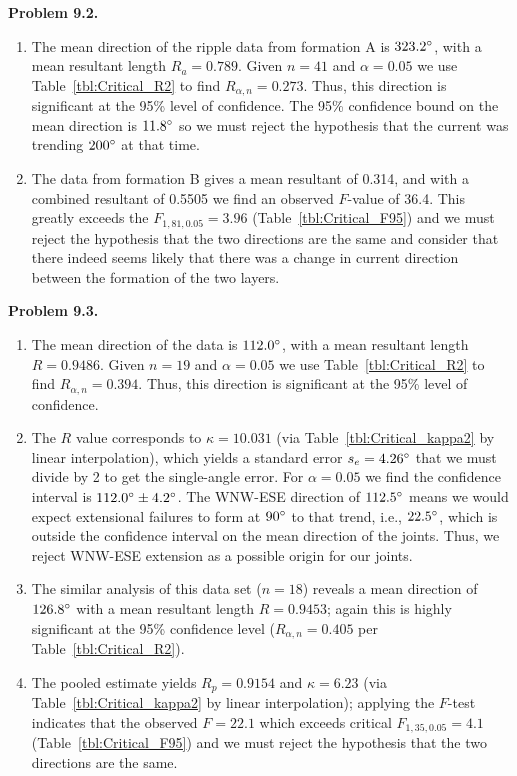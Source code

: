 \noindent
\bf{Problem 9.2.} \\

\begin{enumerate}[label=\alph*)]
\item  The mean direction of the ripple data from formation A is $323.2^{\circ}$,
with a mean resultant length $R_a = 0.789$.  Given $n = 41$ and $\alpha = 0.05$ we use Table~\ref{tbl:Critical_R2}
to find $R_{\alpha,n} = 0.273$.  Thus, this direction is significant at the 95\% level of confidence.
The 95\% confidence bound on the mean direction is $11.8^{\circ}$ so we must reject the hypothesis that the current was
trending $200^{\circ}$ at that time.
\item The data from formation B gives a mean resultant of 0.314, and with a combined resultant of 0.5505 we find
an observed $F$-value of 36.4.  This greatly exceeds the $F_{1,81,0.05} = 3.96$ (Table~\ref{tbl:Critical_F95}) and
we must reject the hypothesis that the two directions are the same and consider that there indeed seems likely that there
was a change in current direction between the formation of the two layers.
\end{enumerate}


\noindent
\bf{Problem 9.3.} \\

\begin{enumerate}[label=\alph*)]
\item  The mean direction of the data is $112.0^{\circ}$,
with a mean resultant length $R = 0.9486$.  Given $n = 19$ and $\alpha = 0.05$ we use Table~\ref{tbl:Critical_R2}
to find $R_{\alpha,n} = 0.394$.  Thus,
this direction is significant at the 95\% level of confidence.

\item The $R$ value corresponds to $\kappa = 10.031$ (via Table~\ref{tbl:Critical_kappa2} by linear interpolation),
which yields a standard error $s_e = 4.26^{\circ}$
that we must divide by 2 to get the single-angle error.  For
$\alpha = 0.05$ we find the confidence interval is $112.0^{\circ}\pm4.2^{\circ}$. The WNW-ESE direction of $112.5^{\circ}$
means we would expect extensional failures to form at $90^{\circ}$ to that trend, i.e., $22.5^{\circ}$, which is outside
the confidence interval on the mean direction of the joints.  Thus, we reject WNW-ESE
extension as a possible origin for our joints.

\item The similar analysis of this data set ($n = 18$) reveals a mean direction of $126.8^{\circ}$ with a mean resultant
length $R = 0.9453$; again this is highly significant at the 95\% confidence level ($R_{\alpha,n} = 0.405$ per Table~\ref{tbl:Critical_R2}).

\item The pooled estimate yields $R_p = 0.9154$ and $\kappa = 6.23$ (via Table~\ref{tbl:Critical_kappa2} by linear interpolation);
applying the $F$-test
indicates that the observed $F = 22.1$ which exceeds critical $F_{1,35,0.05} = 4.1$ (Table~\ref{tbl:Critical_F95}) and
we must reject the hypothesis that the two directions are the same.

\end{enumerate}

